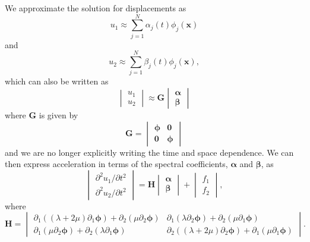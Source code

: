\documentclass[12pt]{article}
\begin{document}
We approximate the solution for displacements as 
\begin{equation}
  u_1 \approx \sum_{j=1}^{N}\alpha_{j}(t)\phi_j(\boldsymbol{x})
\end{equation}
and
\begin{equation}
  u_2 \approx \sum_{j=1}^{N}\beta_{j}(t)\phi_j(\boldsymbol{x}),
\end{equation}
which can also be written as 
\begin{equation}
\begin{vmatrix}
  u_1 \\
  u_2 
\end{vmatrix} \approx 
\boldsymbol{G}
\begin{vmatrix}
  \boldsymbol{\alpha}\\
  \boldsymbol{\beta}
\end{vmatrix}
\end{equation}
where $\boldsymbol{G}$ is given by
\begin{equation}
\boldsymbol{G} = 
\begin{vmatrix}
\boldsymbol{\phi}&\boldsymbol{0}\\
\boldsymbol{0}&\boldsymbol{\phi}
\end{vmatrix}
\end{equation}
and we are no longer explicitly writing the time and space dependence.
We can then express acceleration in terms of the spectral
coefficients, $\boldsymbol{\alpha}$ and $\boldsymbol{\beta}$, as
\begin{equation}\label{Acceleration}
\begin{vmatrix}
  \partial^2 u_1/\partial t^2\\
  \partial^2 u_2/\partial t^2
\end{vmatrix} =
\boldsymbol{H}
\begin{vmatrix}
  \boldsymbol{\alpha}\\
  \boldsymbol{\beta}
\end{vmatrix} + 
\begin{vmatrix}
  f_1\\
  f_2
\end{vmatrix},
\end{equation}
where
\begin{equation}
\boldsymbol{H} = 
\begin{vmatrix}
 \partial_1\left((\lambda + 2\mu)\partial_1 \boldsymbol{\phi}\right) +  
 \partial_2\left(\mu\partial_2 \boldsymbol{\phi}\right)&
 \partial_1\left(\lambda\partial_2 \boldsymbol{\phi}\right) +  
 \partial_2\left(\mu\partial_1 \boldsymbol{\phi}\right)\\
 \partial_1\left(\mu\partial_2 \boldsymbol{\phi}\right) +  
 \partial_2\left(\lambda\partial_1 \boldsymbol{\phi}\right)&
 \partial_2\left((\lambda + 2\mu)\partial_2 \boldsymbol{\phi}\right) +  
 \partial_1\left(\mu\partial_1 \boldsymbol{\phi}\right) 
\end{vmatrix}.
\end{equation}
\end{document}
